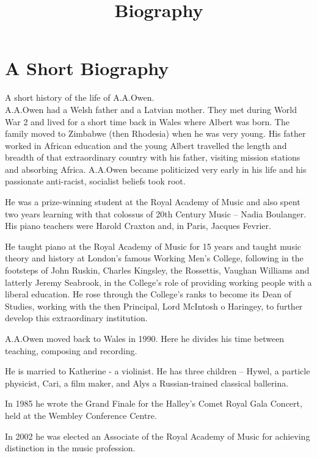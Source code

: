 \documentclass{article}
\title{Biography}
\date{}
\begin{document}
\maketitle
\tableofcontents
\pagebreak

\section{A Short Biography}

A short history of the life of A.A.Owen.\\

A.A.Owen had a Welsh father and a Latvian mother.
They met during World War 2 and lived for a short time back in Wales where Albert was born.
The family moved to Zimbabwe (then Rhodesia) when he was very young.
His father worked in African education and the young Albert travelled the length and breadth of that extraordinary country with his father, visiting mission stations and absorbing Africa.
A.A.Owen became politicized very early in his life and his passionate anti-racist, socialist beliefs took root.

He was a prize-winning student at the Royal Academy of Music and also spent two years learning with that colossus of 20th Century Music – Nadia Boulanger.
His piano teachers were  Harold Craxton and, in Paris, Jacques Fevrier.

He taught piano at the Royal Academy of Music for 15 years and taught music theory and history at London’s famous Working Men’s College, following in the footsteps of John Ruskin, Charles Kingsley, the Rossettis, Vaughan Williams and latterly Jeremy Seabrook, in the College’s role of providing working people with a liberal education.
He rose through the College’s ranks to become its Dean of Studies, working with the then Principal, Lord McIntosh o Haringey, to further develop this extraordinary institution.

A.A.Owen moved back to Wales in 1990.
Here he divides his time between teaching, composing and recording.

He is married to Katherine - a violinist.
He has three children – Hywel, a particle physicist, Cari, a film maker, and Alys a Russian-trained classical ballerina.

In 1985 he wrote the Grand Finale for the Halley’s Comet Royal Gala Concert, held at the Wembley Conference Centre.

In 2002 he was elected an Associate of the Royal Academy of Music for achieving distinction in the music profession.
\end{document}
